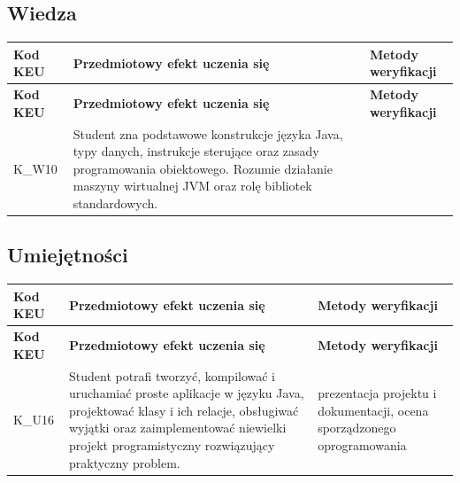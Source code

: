 \documentclass[12pt, a4paper]{article}
\newcommand{\thdrule}{\noalign{\global\setlength{\extrarowheight}{0pt}}}
\newcommand{\thdend}{\noalign{\global\setlength{\extrarowheight}{3pt}}}
\begin{document}
\subsection*{Wiedza}
{\scriptsize
\begin{longtable}{m{1.6cm}m{9.0cm}m{4.2cm}}
\thdrule\toprule
\rowcolor{pjatkRed} {\color{white}\footnotesize\textbf{\vphantom{Ag}Kod KEU}} & {\color{white}\footnotesize\textbf{\vphantom{Ag}Przedmiotowy efekt uczenia się}} & {\color{white}\footnotesize\textbf{\vphantom{Ag}Metody weryfikacji}} \\
\midrule\thdend
\endfirsthead
\thdrule\toprule
\rowcolor{pjatkRed} {\color{white}\footnotesize\textbf{\vphantom{Ag}Kod KEU}} & {\color{white}\footnotesize\textbf{\vphantom{Ag}Przedmiotowy efekt uczenia się}} & {\color{white}\footnotesize\textbf{\vphantom{Ag}Metody weryfikacji}} \\
\midrule\thdend
\endhead
  \rowcolor{tableRowLight} K\_W10 & Student zna podstawowe konstrukcje języka Java, typy danych, instrukcje sterujące oraz zasady programowania obiektowego. Rozumie działanie maszyny wirtualnej JVM oraz rolę bibliotek standardowych. &  \\
\bottomrule
\end{longtable}}

\subsection*{Umiejętności}
{\scriptsize
\begin{longtable}{m{1.6cm}m{9.0cm}m{4.2cm}}
\thdrule\toprule
\rowcolor{pjatkRed} {\color{white}\footnotesize\textbf{\vphantom{Ag}Kod KEU}} & {\color{white}\footnotesize\textbf{\vphantom{Ag}Przedmiotowy efekt uczenia się}} & {\color{white}\footnotesize\textbf{\vphantom{Ag}Metody weryfikacji}} \\
\midrule\thdend
\endfirsthead
\thdrule\toprule
\rowcolor{pjatkRed} {\color{white}\footnotesize\textbf{\vphantom{Ag}Kod KEU}} & {\color{white}\footnotesize\textbf{\vphantom{Ag}Przedmiotowy efekt uczenia się}} & {\color{white}\footnotesize\textbf{\vphantom{Ag}Metody weryfikacji}} \\
\midrule\thdend
\endhead
  \rowcolor{tableRowLight} K\_U16 & Student potrafi tworzyć, kompilować i uruchamiać proste aplikacje w języku Java, projektować klasy i ich relacje, obsługiwać wyjątki oraz zaimplementować niewielki projekt programistyczny rozwiązujący praktyczny problem. & prezentacja projektu i dokumentacji, ocena sporządzonego oprogramowania \\
\bottomrule
\end{longtable}}
\end{document}
